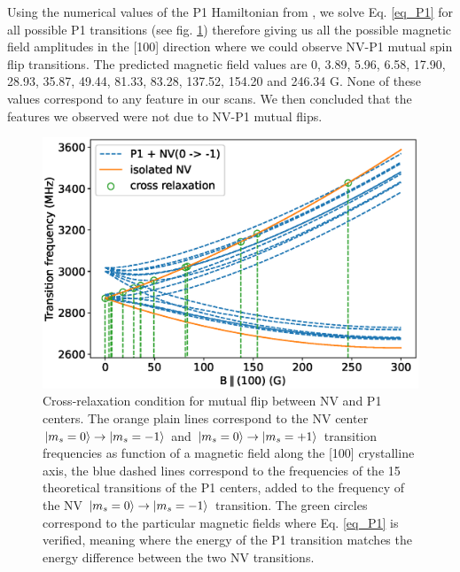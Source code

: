 \documentclass[9pt,twocolumn,twoside]{revtex4-1}
\begin{document}
Using the numerical values of the P1 Hamiltonian from \citep{lazda2020cross}, we solve Eq. \ref{eq_P1} for all possible P1 transitions (see fig. \ref{fig_P1}) therefore giving us all the possible magnetic field amplitudes in the [100] direction where we could observe NV-P1 mutual spin flip transitions. The predicted magnetic field values are 0, 3.89, 5.96, 6.58, 17.90, 28.93, 35.87, 49.44, 81.33, 83.28, 137.52, 154.20 and 246.34 G. None of these values correspond to any feature in our scans. We then concluded that the features we observed were not due to NV-P1 mutual flips.

\begin{figure}
\includegraphics[width=\linewidth]{Transis_P1}
\caption{Cross-relaxation condition for mutual flip between NV and P1 centers. The orange plain lines correspond to the NV center $\ket{m_s=0} \to \ket{m_s=-1}$ and $\ket{m_s=0} \to \ket{m_s=+1}$ transition frequencies as function of a magnetic field along the [100] crystalline axis, the blue dashed lines correspond to the frequencies of the 15 theoretical transitions of the P1 centers, added to the frequency of the NV $\ket{m_s=0} \to \ket{m_s=-1}$ transition. The green circles correspond to the particular magnetic fields where Eq. \ref{eq_P1} is verified, meaning where the energy of the P1 transition matches the energy difference between the two NV transitions.}\label{fig_P1}
\end{figure}

\end{document}
